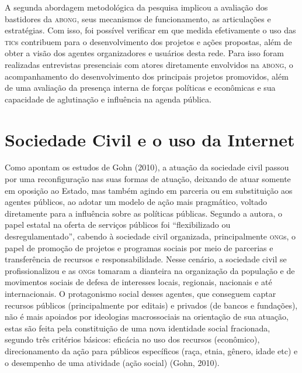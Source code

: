 A segunda abordagem metodológica da pesquisa implicou a avaliação dos
bastidores da \textsc{abong}, seus mecanismos de funcionamento, as articulações e
estratégias. Com isso, foi possível verificar em que medida efetivamente
o uso das \textsc{tic}s contribuem para o desenvolvimento dos projetos e ações
propostas, além de obter a visão dos agentes organizadores e usuários
desta rede. Para isso foram realizadas entrevistas presenciais com
atores diretamente envolvidos na \textsc{abong}, o acompanhamento do
desenvolvimento dos principais projetos promovidos, além de uma
avaliação da presença interna de forças políticas e econômicas e sua
capacidade de aglutinação e influência na agenda pública.

\section{Sociedade Civil e o uso da Internet}

\noindent{}Como apontam os estudos de Gohn (2010), a atuação da sociedade civil
passou por uma reconfiguração nas suas formas de atuação, deixando de
atuar somente em oposição ao Estado, mas também agindo em parceria ou em
substituição aos agentes públicos, ao adotar um modelo de ação mais
pragmático, voltado diretamente para a influência sobre as políticas
públicas. Segundo a autora, o papel estatal na oferta de serviços
públicos foi ``flexibilizado ou desregulamentado'', cabendo à sociedade
civil organizada, principalmente \textsc{ong}s, o papel de promoção de projetos e
programas sociais por meio de parcerias e transferência de recursos e
responsabilidade. Nesse cenário, a sociedade civil se profissionalizou e
as \textsc{ong}s tomaram a dianteira na organização da população e de movimentos
sociais de defesa de interesses locais, regionais, nacionais e até
internacionais. O protagonismo social desses agentes, que conseguem
captar recursos públicos (principalmente por editais) e privados (de
bancos e fundações), não é mais apoiados por ideologias macrossociais na
orientação de sua atuação, estas são feita pela constituição de uma nova
identidade social fracionada, segundo três critérios básicos: eficácia
no uso dos recursos (econômico), direcionamento da ação para públicos
específicos (raça, etnia, gênero, idade etc) e o desempenho de uma
atividade (ação social) (Gohn, 2010).

